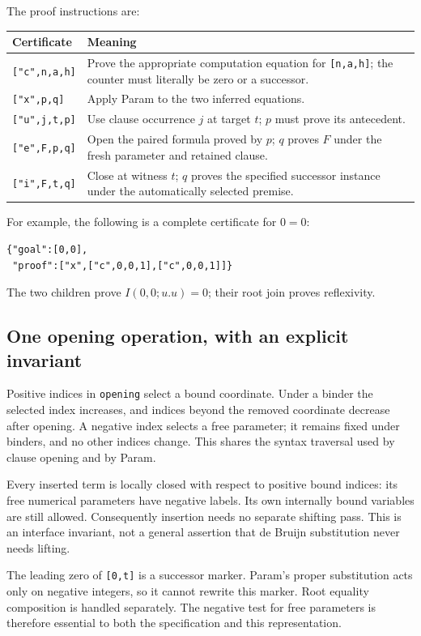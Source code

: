 \documentclass[11pt,letterpaper]{article}
\begin{document}
The proof instructions are:
\begin{center}
\begin{tabularx}{\linewidth}{lX}
\toprule
Certificate & Meaning\\
\midrule
\texttt{["c",n,a,h]} & Prove the appropriate computation equation for
  \texttt{[n,a,h]}; the counter must literally be zero or a successor.\\
\texttt{["x",p,q]} & Apply Param to the two inferred equations.\\
\texttt{["u",j,t,p]} & Use clause occurrence $j$ at target $t$;
  $p$ must prove its antecedent.\\
\texttt{["e",F,p,q]} & Open the paired formula proved by $p$;
  $q$ proves $F$ under the fresh parameter and retained clause.\\
\texttt{["i",F,t,q]} & Close at witness $t$; $q$ proves the specified
  successor instance under the automatically selected premise.\\
\bottomrule
\end{tabularx}
\end{center}

For example, the following is a complete certificate for $0=0$:
\begin{lstlisting}[language={}]
{"goal":[0,0],
 "proof":["x",["c",0,0,1],["c",0,0,1]]}
\end{lstlisting}
The two children prove $I(0,0;u.u)=0$; their root join proves reflexivity.

\subsection{One opening operation, with an explicit invariant}

Positive indices in \texttt{opening} select a bound coordinate. Under a
binder the selected index increases, and indices beyond the removed
coordinate decrease after opening. A negative index selects a free
parameter; it remains fixed under binders, and no other indices change.
This shares the syntax traversal used by clause opening and by Param.

Every inserted term is locally closed with respect to positive bound
indices: its free numerical parameters have negative labels. Its own
internally bound variables are still allowed. Consequently insertion
needs no separate shifting pass. This is an interface invariant, not a
general assertion that de Bruijn substitution never needs lifting.

The leading zero of \texttt{[0,t]} is a successor marker. Param's proper
substitution acts only on negative integers, so it cannot rewrite this
marker. Root equality composition is handled separately. The negative
test for free parameters is therefore essential to both the specification
and this representation.
\end{document}
